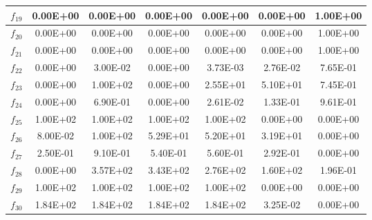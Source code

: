 \begin{table}[t]
{\begin{tabular}{|c|c|c|c|c|c|c|}
$f_{19}$ & 0.00E+00 & 0.00E+00 & 0.00E+00 & 0.00E+00 & 0.00E+00 & 1.00E+00 \\ \hline
$f_{20}$ & 0.00E+00 & 0.00E+00 & 0.00E+00 & 0.00E+00 & 0.00E+00 & 1.00E+00 \\ \hline
$f_{21}$ & 0.00E+00 & 0.00E+00 & 0.00E+00 & 0.00E+00 & 0.00E+00 & 1.00E+00 \\ \hline
$f_{22}$ & 0.00E+00 & 3.00E-02 & 0.00E+00 & 3.73E-03 & 2.76E-02 & 7.65E-01 \\ \hline
$f_{23}$ & 0.00E+00 & 1.00E+02 & 0.00E+00 & 2.55E+01 & 5.10E+01 & 7.45E-01 \\ \hline
$f_{24}$ & 0.00E+00 & 6.90E-01 & 0.00E+00 & 2.61E-02 & 1.33E-01 & 9.61E-01 \\ \hline
$f_{25}$ & 1.00E+02 & 1.00E+02 & 1.00E+02 & 1.00E+02 & 0.00E+00 & 0.00E+00 \\ \hline
$f_{26}$ & 8.00E-02 & 1.00E+02 & 5.29E+01 & 5.20E+01 & 3.19E+01 & 0.00E+00 \\ \hline
$f_{27}$ & 2.50E-01 & 9.10E-01 & 5.40E-01 & 5.60E-01 & 2.92E-01 & 0.00E+00 \\ \hline
$f_{28}$ & 0.00E+00 & 3.57E+02 & 3.43E+02 & 2.76E+02 & 1.60E+02 & 1.96E-01 \\ \hline
$f_{29}$ & 1.00E+02 & 1.00E+02 & 1.00E+02 & 1.00E+02 & 0.00E+00 & 0.00E+00 \\ \hline
$f_{30}$ & 1.84E+02 & 1.84E+02 & 1.84E+02 & 1.84E+02 & 3.25E-02 & 0.00E+00 \\ \hline
\end{tabular}%
}
\end{table}

